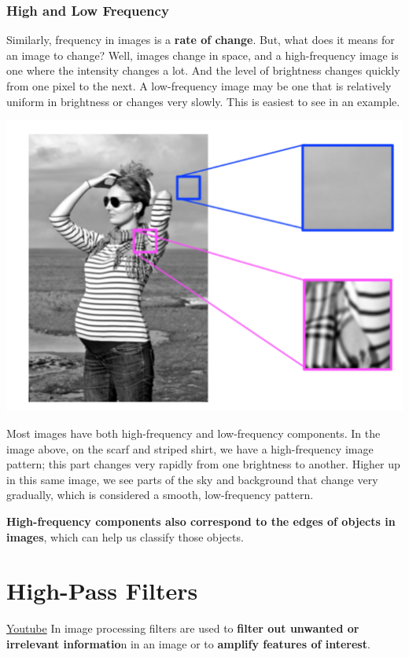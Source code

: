 \subsubsection{High and Low Frequency}

Similarly, frequency in images is a \textbf{rate of change}. But, what does it means for an image to change? Well, images change in space, and a high-frequency image is one where the intensity changes a lot. And the level of brightness changes quickly from one pixel to the next. A low-frequency image may be one that is relatively uniform in brightness or changes very slowly. This is easiest to see in an example.

\includegraphics[width=0.75\linewidth]{img//cnn//concepts/screen-shot-2018-09-24-at-3.18.33-pm.png}

Most images have both high-frequency and low-frequency components. In the image above, on the scarf and striped shirt, we have a high-frequency image pattern; this part changes very rapidly from one brightness to another. Higher up in this same image, we see parts of the sky and background that change very gradually, which is considered a smooth, low-frequency pattern. \newline

\textbf{High-frequency components also correspond to the edges of objects in images}, which can help us classify those objects.

\section{High-Pass Filters}
\href{https://www.youtube.com/watch?v=2CW1avinvYQ&ab_channel=Udacity}{Youtube} \newline
In image processing filters are used to \textbf{filter out unwanted or irrelevant informatio}n in an image or to \textbf{amplify features of interest}. \newline

